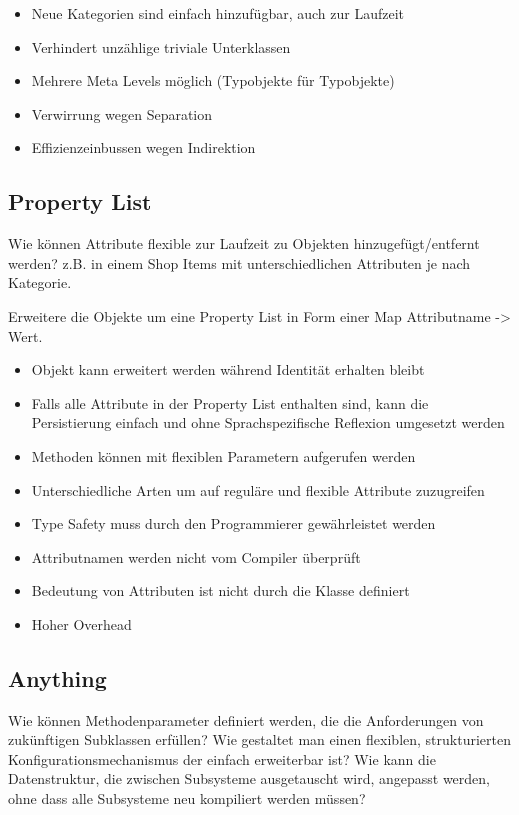 \begin{itemize}
	\item Neue Kategorien sind einfach hinzufügbar, auch zur Laufzeit
	\item Verhindert unzählige triviale Unterklassen
	\item Mehrere Meta Levels möglich (Typobjekte für Typobjekte)
	\item Verwirrung wegen Separation
	\item Effizienzeinbussen wegen Indirektion
\end{itemize}

\subsection{Property List}

Wie können Attribute flexible zur Laufzeit zu Objekten hinzugefügt/entfernt werden? z.B. in einem Shop Items mit unterschiedlichen Attributen je nach Kategorie.

Erweitere die Objekte um eine Property List in Form einer Map Attributname -> Wert.

\begin{itemize}
	\item Objekt kann erweitert werden während Identität erhalten bleibt
	\item Falls alle Attribute in der Property List enthalten sind, kann die Persistierung einfach und ohne Sprachspezifische Reflexion umgesetzt werden
	\item Methoden können mit flexiblen Parametern aufgerufen werden
	\item Unterschiedliche Arten um auf reguläre und flexible Attribute zuzugreifen
	\item Type Safety muss durch den Programmierer gewährleistet werden
	\item Attributnamen werden nicht vom Compiler überprüft
	\item Bedeutung von Attributen ist nicht durch die Klasse definiert
	\item Hoher Overhead
\end{itemize}

\subsection{Anything}

Wie können Methodenparameter definiert werden, die die Anforderungen von zukünftigen Subklassen erfüllen? Wie gestaltet man einen flexiblen, strukturierten Konfigurationsmechanismus der einfach erweiterbar ist? Wie kann die Datenstruktur, die zwischen Subsysteme ausgetauscht wird, angepasst werden, ohne dass alle Subsysteme neu kompiliert werden müssen?

